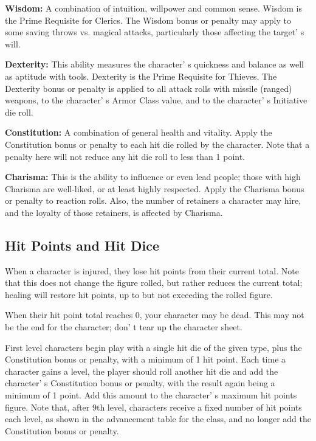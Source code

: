 \documentclass[a4paper,twoside,openany,10pt]{book}
\begin{document}
\begin{multicols}{2}
\textbf{Wisdom: } A combination of intuition, willpower and common sense. Wisdom is the Prime Requisite for Clerics. The Wisdom bonus or penalty may apply to some saving throws vs. magical attacks, particularly those affecting the target' s will.

\textbf{Dexterity: } This ability measures the character' s quickness and balance as well as aptitude with tools. Dexterity is the Prime Requisite for Thieves. The Dexterity bonus or penalty is applied to all attack rolls with missile (ranged) weapons, to the character' s Armor Class value, and to
the character' s Initiative die roll.

\textbf{Constitution: } A combination of general health and vitality. Apply the Constitution bonus or penalty to each hit die rolled by the character. Note that a penalty here will not reduce any hit die roll to less than 1 point.

\textbf{Charisma: } This is the ability to influence or even lead people; those with high Charisma are well-liked, or at least highly respected. Apply the Charisma bonus or penalty to reaction rolls. Also, the number of retainers a character may hire, and the loyalty of those retainers, is affected by Charisma.

\subsection{Hit Points and Hit Dice}\label{hit-points-and-hit-dice}

When a character is injured, they lose hit points from their current total. Note that this does not change the figure rolled, but rather reduces the current total; healing will restore hit points, up to but not exceeding the rolled figure.

When their hit point total reaches 0, your character may be dead. This may not be the end for the character; don' t tear up the character sheet.

First level characters begin play with a single hit die of the given type, plus the Constitution bonus or penalty, with a minimum of 1 hit point. Each time a character gains a level, the player should roll another hit die and add the character' s Constitution bonus or penalty, with the result again being a minimum of 1 point. Add this amount to the character' s maximum hit points figure. Note that, after 9th level, characters receive a fixed number of hit points each level, as shown in the advancement table for the class, and no longer add the Constitution bonus or penalty.


\end{multicols}
\end{document}
